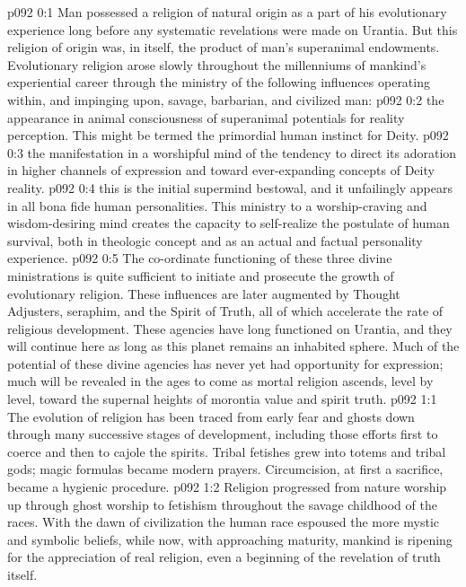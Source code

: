 \author{Melchizedek}
\vs p092 0:1 Man possessed a religion of natural origin as a part of his evolutionary experience long before any systematic revelations were made on Urantia. But this religion of  origin was, in itself, the product of man’s superanimal endowments. Evolutionary religion arose slowly throughout the millenniums of mankind’s experiential career through the ministry of the following influences operating within, and impinging upon, savage, barbarian, and civilized man:\plusone
\pc \vs p092 0:2 \bibnobreakspace {}the appearance in animal consciousness of superanimal potentials for reality perception. This might be termed the primordial human instinct for Deity.
\pc \vs p092 0:3 \bibnobreakspace {}the manifestation in a worshipful mind of the tendency to direct its adoration in higher channels of expression and toward ever\hyp{}expanding concepts of Deity reality.
\pc \vs p092 0:4 \bibnobreakspace {}this is the initial supermind bestowal, and it unfailingly appears in all bona fide human personalities. This ministry to a worship\hyp{}craving and wisdom\hyp{}desiring mind creates the capacity to self\hyp{}realize the postulate of human survival, both in theologic concept and as an actual and factual personality experience.
\pc \vs p092 0:5 The co\hyp{}ordinate functioning of these three divine ministrations is quite sufficient to initiate and prosecute the growth of evolutionary religion. These influences are later augmented by Thought Adjusters, seraphim, and the Spirit of Truth, all of which accelerate the rate of religious development. These agencies have long functioned on Urantia, and they will continue here as long as this planet remains an inhabited sphere. Much of the potential of these divine agencies has never yet had opportunity for expression; much will be revealed in the ages to come as mortal religion ascends, level by level, toward the supernal heights of morontia value and spirit truth.
\vs p092 1:1 The evolution of religion has been traced from early fear and ghosts down through many successive stages of development, including those efforts first to coerce and then to cajole the spirits. Tribal fetishes grew into totems and tribal gods; magic formulas became modern prayers. Circumcision, at first a sacrifice, became a hygienic procedure.
\vs p092 1:2 Religion progressed from nature worship up through ghost worship to fetishism throughout the savage childhood of the races. With the dawn of civilization the human race espoused the more mystic and symbolic beliefs, while now, with approaching maturity, mankind is ripening for the appreciation of real religion, even a beginning of the revelation of truth itself.
